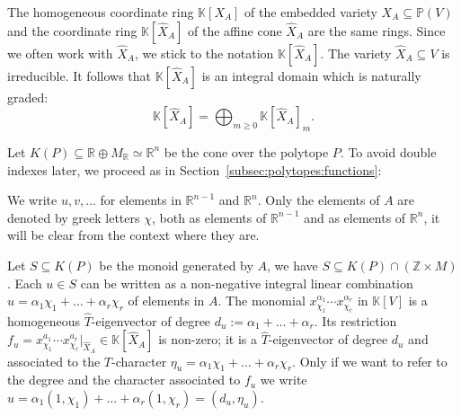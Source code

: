\documentclass[12pt, a4article]{amsart}   	%
\numberwithin{equation}{section}
\theoremstyle{plain}
\theoremstyle{definition}
\newcommand{\R}{{\mathbb R}}
\begin{document}
The homogeneous coordinate ring $\mathbb K[X_{A}]$ of the embedded variety $X_{A}\subseteq \mathbb P(V)$ and the coordinate ring $\mathbb K[\hat X_{A}]$ of the affine cone $\hat X_{A}$ are the same rings. Since we often work with $\hat X_A$, we stick to the notation $\mathbb K[\hat X_A]$. The variety $\hat X_{A}\subseteq V$ is irreducible. It follows that $\mathbb K[\hat X_A]$ is an integral domain which is naturally graded: 
$$\mathbb K[\hat X_A]=\bigoplus_{m\ge 0}\mathbb K[\hat X_A]_m.$$

Let $K(P)\subseteq \mathbb R\oplus M_\mathbb R\simeq \R^n$ be the cone over the polytope $P$. To avoid double indexes later, we proceed as in Section~\ref{subsec:polytopes:functions}:
\par\vskip 5pt
We write $u,v,\ldots$ for elements in $\R^{n-1}$ and $\R^n$. Only the elements of $A$ are  denoted by greek letters $\chi$, both as elements of $\R^{n-1}$  and as elements of  $\R^n$, it will be clear from the context where they are.
\par\vskip 5pt
Let $S\subseteq K(P)$ be the monoid generated by $A$, we have $S\subseteq K(P)\cap (\mathbb Z\times M)$. Each $u\in S$ can be written as a non-negative integral linear combination $u= \alpha_1\chi_1+\ldots +\alpha_r\chi_r$ of elements in $A$. The monomial $x_{\chi_1}^{\alpha_1}\cdots x_{\chi_r}^{\alpha_r}$ in $\mathbb K[V]$ is a homogeneous $\hat T$-eigenvector of degree $d_u:=\alpha_1+\ldots+\alpha_r$. Its restriction $f_u=x_{\chi_1}^{a_1}\cdots x_{\chi_r}^{a_r}\vert_{\hat X_{A}}\in \mathbb K[\hat X_A]$ is non-zero; it is a $\hat T$-eigenvector of degree $d_u$ and associated to the $T$-character $\eta_u=\alpha_1\chi_1+\ldots+\alpha_r\chi_r$. Only if we want to refer to the degree and the character associated to $f_u$ we write $u=\alpha_1(1,\chi_1)+\ldots+\alpha_r(1,\chi_r)=(d_u,\eta_u)$.
\end{document}
